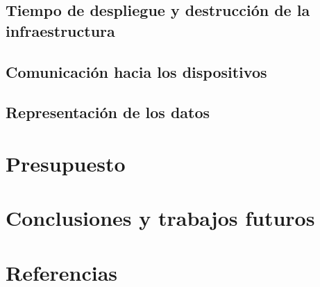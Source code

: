 \documentclass[12pt]{article}
\begin{document}
\subsection{Tiempo de despliegue y destrucción de la infraestructura}

\subsection{Comunicación hacia los dispositivos}

\subsection{Representación de los datos}




\section{Presupuesto}


\section{Conclusiones y trabajos futuros}


\newpage
\setcounter{secnumdepth}{0}
\section{Referencias}
\printbibliography[heading=none]
\end{document}
